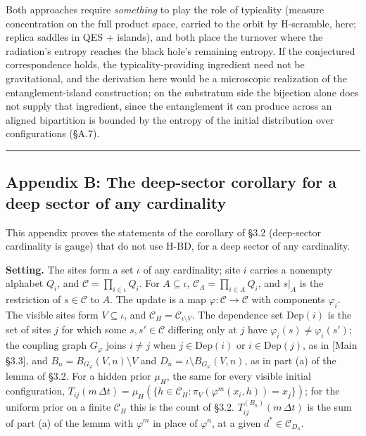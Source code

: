 \documentclass[
]{article}
\begin{document}
Both approaches require \emph{something} to play the role of typicality
(measure concentration on the full product space, carried to the orbit
by H-scramble, here; replica saddles in QES + islands), and both place
the turnover where the radiation's entropy reaches the black hole's
remaining entropy. If the conjectured correspondence holds, the
typicality-providing ingredient need not be gravitational, and the
derivation here would be a microscopic realization of the
entanglement-island construction; on the substratum side the bijection
alone does not supply that ingredient, since the entanglement it can
produce across an aligned bipartition is bounded by the entropy of the
initial distribution over configurations (§A.7).

\begin{center}\rule{0.5\linewidth}{0.5pt}\end{center}

\hypertarget{appendix-b-the-deep-sector-corollary-for-a-deep-sector-of-any-cardinality}{%
\subsection{Appendix B: The deep-sector corollary for a deep sector of
any
cardinality}\label{appendix-b-the-deep-sector-corollary-for-a-deep-sector-of-any-cardinality}}

This appendix proves the statements of the corollary of §3.2
(deep-sector cardinality is gauge) that do not use H-BD, for a deep
sector of any cardinality.

\textbf{Setting.} The sites form a set \(\iota\) of any cardinality;
site \(i\) carries a nonempty alphabet \(Q_i\), and
\(\mathcal{C} = \prod_{i \in \iota} Q_i\). For \(A \subseteq \iota\),
\(\mathcal{C}_A = \prod_{i \in A} Q_i\), and \(s|_A\) is the restriction
of \(s \in \mathcal{C}\) to \(A\). The update is a map
\(\varphi : \mathcal{C} \to \mathcal{C}\) with components \(\varphi_i\).
The visible sites form \(V \subseteq \iota\), and
\(\mathcal{C}_H = \mathcal{C}_{\iota \setminus V}\). The dependence set
\(\mathrm{Dep}(i)\) is the set of sites \(j\) for which some
\(s, s' \in \mathcal{C}\) differing only at \(j\) have
\(\varphi_i(s) \neq \varphi_i(s')\); the coupling graph \(G_\varphi\)
joins \(i \neq j\) when \(j \in \mathrm{Dep}(i)\) or
\(i \in \mathrm{Dep}(j)\), as in {[}Main §3.3{]}, and
\(B_n = B_{G_\varphi}(V, n) \setminus V\) and
\(D_n = \iota \setminus B_{G_\varphi}(V, n)\), as in part (a) of the
lemma of §3.2. For a hidden prior \(\mu_H\), the same for every visible
initial configuration,
\(T_{ij}(m\,\Delta t) = \mu_H(\{h \in \mathcal{C}_H : \pi_V(\varphi^m(x_i, h)) = x_j\})\);
for the uniform prior on a finite \(\mathcal{C}_H\) this is the count of
§3.2. \(T^{(B_n)}_{ij}(m\,\Delta t)\) is the sum of part (a) of the
lemma with \(\varphi^m\) in place of \(\varphi^n\), at a given
\(d^* \in \mathcal{C}_{D_n}\).
\end{document}
